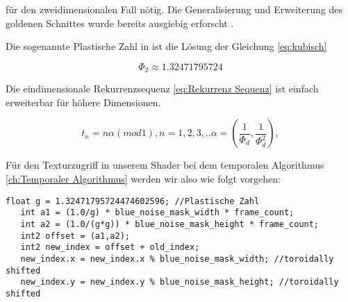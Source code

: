 für den zweidimensionalen Fall nötig. Die Generalisierung und Erweiterung des goldenen 
Schnittes wurde bereits ausgiebig erforscht \cite{krcadinac2006new}.

Die sogenannte Plastische Zahl in ist die Lösung der
Gleichung \ref{eq:kubisch}

\begin{tcolorbox}[rightrule=3mm, rounded corners=east]
    \begin{equation}\label{eq:plastische Zahl}
        \Phi_{2} \approx 1.32471795724
    \end{equation}
\end{tcolorbox}

Die eindimensionale Rekurrenzsequenz \ref{eq:Rekurrenz Sequenz} ist einfach erweiterbar 
für höhere Dimensionen.
\begin{tcolorbox}[rightrule=3mm, rounded corners=east]
    \begin{equation}\label{eq:1 zu N - Dimensional}
        t_{n} = n\alpha(mod 1), n = 1,2,3,..
        \alpha = (\frac{1}{\Phi_{d}}, \frac{1}{\Phi_{d}^{2}}),
    \end{equation}
\end{tcolorbox}

Für den Texturzugriff in unserem Shader bei dem temporalen Algorithmus \ref{ch:Temporaler Algorithmus}
werden wir also wie folgt vorgehen:

\begin{lstlisting}[style=CStyle]
   float g = 1.32471795724474602596; //Plastische Zahl
   int a1 = (1.0/g) * blue_noise_mask_width * frame_count;
   int a2 = (1.0/(g*g)) * blue_noise_mask_height * frame_count;
   int2 offset = (a1,a2);
   int2 new_index = offset + old_index;
   new_index.x = new_index.x % blue_noise_mask_width; //toroidally shifted
   new_index.y = new_index.y % blue_noise_mask_height; //toroidally shifted
\end{lstlisting}
